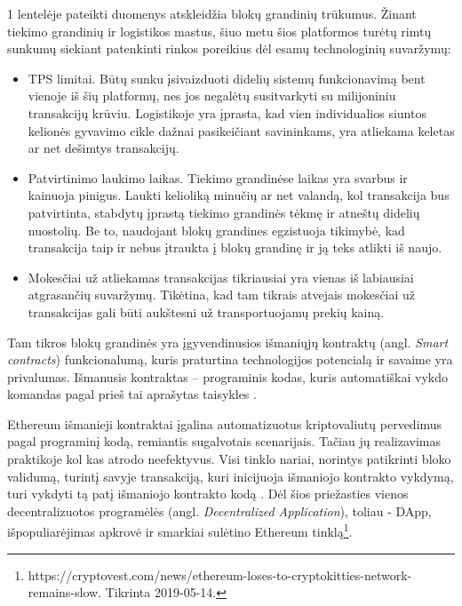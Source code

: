 1 lentelėje pateikti duomenys atskleidžia blokų grandinių trūkumus. Žinant tiekimo grandinių ir logistikos mastus, šiuo metu šios platformos turėtų rimtų sunkumų siekiant patenkinti rinkos poreikius dėl esamų technologinių suvaržymų: 
\begin{itemize}
    \item TPS limitai. Būtų sunku įsivaizduoti didelių sistemų funkcionavimą bent vienoje iš šių platformų, nes jos negalėtų susitvarkyti su milijoniniu transakcijų krūviu. Logistikoje yra įprasta, kad vien individualios siuntos kelionės gyvavimo cikle dažnai pasikeičiant savininkams, yra atliekama keletas ar net dešimtys transakcijų.
    \item Patvirtinimo laukimo laikas. Tiekimo grandinėse laikas yra svarbus ir kainuoja pinigus. Laukti kelioliką minučių ar net valandą, kol transakcija bus patvirtinta, stabdytų įprastą tiekimo grandinės tėkmę ir atneštų didelių nuostolių. Be to, naudojant blokų grandines egzistuoja tikimybė, kad transakcija taip ir nebus įtraukta į blokų grandinę ir ją teks atlikti iš naujo.
    \item Mokesčiai už atliekamas transakcijas tikriausiai yra vienas iš labiausiai atgrasančių suvaržymų. Tikėtina, kad tam tikrais atvejais mokesčiai už transakcijas gali būti aukštesni už transportuojamų prekių kainą.
\end{itemize} 

Tam tikros blokų grandinės yra įgyvendinusios išmaniųjų kontraktų (angl. \textit{Smart contracts}) funkcionalumą, kuris praturtina technologijos potencialą ir savaime yra privalumas. Išmanusis kontraktas – programinis kodas, kuris automatiškai vykdo komandas pagal prieš tai aprašytas taisykles \cite{buterin2013ethereum}.

Ethereum išmanieji kontraktai įgalina automatizuotus kriptovaliutų pervedimus pagal programinį kodą, remiantis sugalvotais scenarijais. Tačiau jų realizavimas praktikoje kol kas atrodo neefektyvus. Visi tinklo nariai, norintys patikrinti bloko validumą, turintį savyje transakciją, kuri inicijuoja išmaniojo kontrakto vykdymą, turi vykdyti tą patį išmaniojo kontrakto kodą \cite{buterin2013ethereum}. Dėl šios priežasties vienos decentralizuotos programėlės (angl. \textit{Decentralized Application}), toliau - DApp, išpopuliarėjimas apkrovė ir smarkiai sulėtino Ethereum tinklą\footnote{https://cryptovest.com/news/ethereum-loses-to-cryptokitties-network-remains-slow. Tikrinta 2019-05-14.}.\pagebreak




